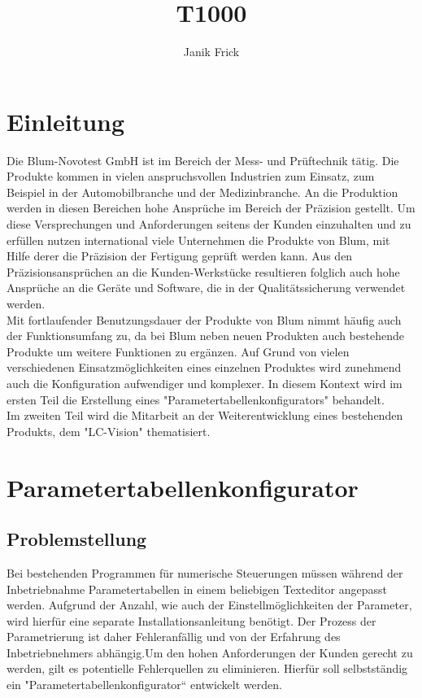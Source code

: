 \documentclass[10pt,a4paper]{article}
\author{Janik Frick}
\title{T1000}
\begin{document}

\tableofcontents
\newpage
\section{Einleitung}
Die Blum-Novotest GmbH ist im Bereich der Mess- und Prüftechnik tätig. Die Produkte kommen in vielen anspruchsvollen Industrien zum Einsatz, zum Beispiel in der Automobilbranche und der Medizinbranche. An die Produktion werden in diesen Bereichen hohe Ansprüche im Bereich der Präzision gestellt. Um diese Versprechungen und Anforderungen seitens der Kunden einzuhalten und zu erfüllen nutzen international viele Unternehmen die Produkte von Blum, mit Hilfe derer die Präzision der Fertigung geprüft werden kann. Aus den Präzisionsansprüchen an die Kunden-Werkstücke resultieren folglich auch hohe Ansprüche an die Geräte und Software, die in der Qualitätssicherung verwendet werden. \\
Mit fortlaufender Benutzungsdauer der Produkte von Blum nimmt häufig auch der Funktionsumfang zu, da bei Blum neben neuen Produkten auch bestehende Produkte um weitere Funktionen zu ergänzen. Auf Grund von vielen verschiedenen Einsatzmöglichkeiten eines einzelnen Produktes wird zunehmend auch die Konfiguration aufwendiger und komplexer. In diesem Kontext wird im ersten Teil die Erstellung eines "Parametertabellenkonfigurators" behandelt.\\
Im zweiten Teil wird die Mitarbeit an der Weiterentwicklung eines bestehenden Produkts, dem "LC-Vision" thematisiert.\newpage 
\section{Parametertabellenkonfigurator} 
\subsection{Problemstellung}
Bei bestehenden Programmen für numerische Steuerungen müssen während der Inbetriebnahme Parametertabellen in einem beliebigen Texteditor angepasst werden. Aufgrund der Anzahl, wie auch der Einstellmöglichkeiten der Parameter, wird hierfür eine separate Installationsanleitung benötigt. Der Prozess der Parametrierung ist daher Fehleranfällig und von der Erfahrung des Inbetriebnehmers abhängig.Um den hohen Anforderungen der Kunden gerecht zu werden, gilt es potentielle Fehlerquellen zu eliminieren. Hierfür soll selbstständig ein "Parametertabellenkonfigurator“ entwickelt werden.\newpage
\end{document}

